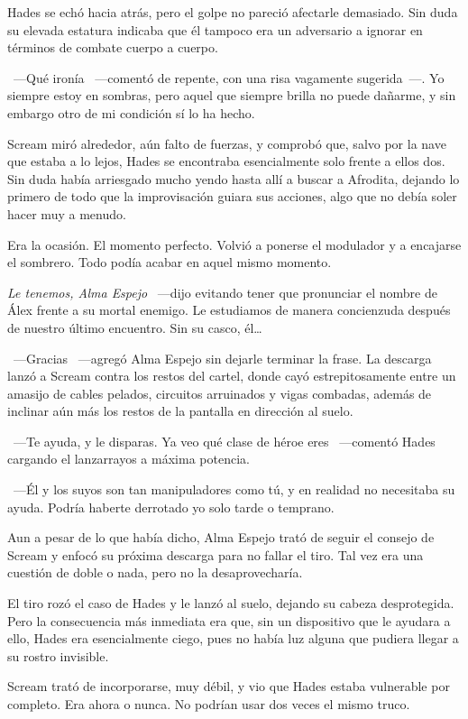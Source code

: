 Hades se echó hacia atrás, pero el golpe no pareció afectarle demasiado. Sin duda su elevada estatura indicaba que él tampoco era un adversario a ignorar en términos de combate cuerpo a cuerpo.

~---Qué ironía ~---comentó de repente, con una risa vagamente sugerida~---. Yo siempre estoy en sombras, pero aquel que siempre brilla no puede dañarme, y sin embargo otro de mi condición sí lo ha hecho.

Scream miró alrededor, aún falto de fuerzas, y comprobó que, salvo por la nave que estaba a lo lejos, Hades se encontraba esencialmente solo frente a ellos dos. Sin duda había arriesgado mucho yendo hasta allí a buscar a Afrodita, dejando lo primero de todo que la improvisación guiara sus acciones, algo que no debía soler hacer muy a menudo.

Era la ocasión. El momento perfecto. Volvió a ponerse el modulador y a encajarse el sombrero. Todo podía acabar en aquel mismo momento.

\emph{Le tenemos, Alma Espejo} ~---dijo evitando tener que pronunciar el nombre de Álex frente a su mortal enemigo. Le estudiamos de manera concienzuda después de nuestro último encuentro. Sin su casco, él\dots

~---Gracias ~---agregó Alma Espejo sin dejarle terminar la frase. La descarga lanzó a Scream contra los restos del cartel, donde cayó estrepitosamente entre un amasijo de cables pelados, circuitos arruinados y vigas combadas, además de inclinar aún más los restos de la pantalla en dirección al suelo.

~---Te ayuda, y le disparas. Ya veo qué clase de héroe eres ~---comentó Hades cargando el lanzarrayos a máxima potencia.

~---Él y los suyos son tan manipuladores como tú, y en realidad no necesitaba su ayuda. Podría haberte derrotado yo solo tarde o temprano.

Aun a pesar de lo que había dicho, Alma Espejo trató de seguir el consejo de Scream y enfocó su próxima descarga para no fallar el tiro. Tal vez era una cuestión de doble o nada, pero no la desaprovecharía.

El tiro rozó el caso de Hades y le lanzó al suelo, dejando su cabeza desprotegida. Pero la consecuencia más inmediata era que, sin un dispositivo que le ayudara a ello, Hades era esencialmente ciego, pues no había luz alguna que pudiera llegar a su rostro invisible.

Scream trató de incorporarse, muy débil, y vio que Hades estaba vulnerable por completo. Era ahora o nunca. No podrían usar dos veces el mismo truco.

